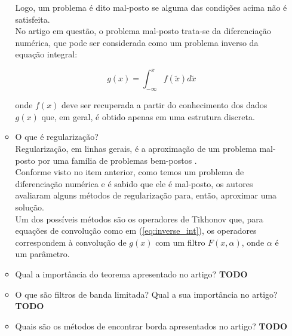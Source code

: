 \documentclass[12pt]{article}
\begin{document}
\begin{itemize}
\begin{itemize}
Logo, um problema é dito mal-posto se alguma das condições acima não é satisfeita.  
\\No artigo em questão, o problema mal-posto trata-se da diferenciação numérica, que pode ser considerada como um problema
inverso da equação integral:

\begin{equation} \label{eq:inverse_int}
   g(x) = \int_{-\infty}^{x} f(\tilde{x}) d\tilde{x}
\end{equation}

onde $f(x)$ deve ser recuperada a partir do conhecimento dos dados $g(x)$ que, em geral, é obtido apenas em uma estrutura discreta.
\\

\item O que é regularização?
\\Regularização, em linhas gerais, é a aproximação de um problema mal-posto por uma família de problemas bem-postos \cite{Engl-1981}.
\\Conforme visto no item anterior, como temos um problema de diferenciação numérica e é sabido que ele é mal-posto, os autores 
avaliaram alguns métodos de regularização para, então, aproximar uma solução.
\\Um dos possíveis métodos são os operadores de Tikhonov que, para equações de convolução como em (\ref{eq:inverse_int}),
os operadores correspondem à convolução de $g(x)$ com um filtro $F(x, \alpha)$, onde $\alpha$ é um parâmetro.
\\

\item Qual a importância do teorema apresentado no artigo?
\textbf{TODO}

\item O que são filtros de banda limitada? Qual a sua importância no artigo?
\textbf{TODO}

\item Quais são os métodos de encontrar borda apresentados no artigo?
\textbf{TODO}

\end{itemize}
\end{itemize}

\printbibliography
\end{document}
